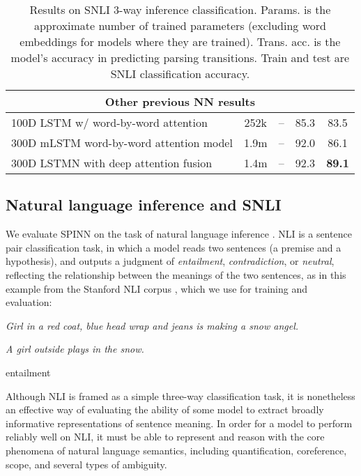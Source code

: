 \documentclass[11pt]{article}
\begin{document}
\begin{table*}[t]
\begin{tabular}{lcccc}
\midrule
\multicolumn{5}{c}{Other previous NN results}\\
\midrule
100D LSTM w/ word-by-word attention \citep{rocktaschel2015reasoning}
                        & 252k               & --              &   85.3   &   83.5       \\
300D mLSTM word-by-word attention model \citep{DBLP:journals/corr/WangJ15b}
                        & 1.9m               & --             &   92.0   &   86.1      \\
300D LSTMN with deep attention fusion \citep{cheng2016long}
                        & 1.4m               & --                &   92.3   &   \textbf{89.1}      \\
    \bottomrule
  \end{tabular}
\caption{\protect\label{tab:results}Results on SNLI 3-way inference classification. Params. is the approximate number of trained parameters (excluding word embeddings for models where they are trained). Trans. acc. is the model's accuracy in predicting parsing transitions. Train and test are SNLI classification accuracy.} 
\end{table*}


\subsection{Natural language inference and SNLI}

We evaluate SPINN on the task of natural language inference \citep[NLI, also known as recognizing textual entailment, or RTE][]{dagan2006pascal,MacCartney09}. NLI is a sentence pair classification task, in which a model reads two sentences (a premise and a hypothesis), and outputs a judgment of {\it entailment}, {\it contradiction}, or {\it neutral}, reflecting the relationship between the meanings of the two sentences, as in this example from the Stanford NLI corpus \citep[SNLI][]{snli:emnlp2015}, which we use for training and evaluation: 

\begin{description}\small 
\item[\bf Premise:] {\it Girl in a red coat, blue head wrap and jeans is making a snow angel.}
\item[\bf Hypothesis:] {\it A girl outside plays in the snow.}
\item[\bf Correct label:] entailment
\end{description}

Although NLI is framed as a simple three-way classification task, it is nonetheless an effective way of evaluating the ability of some model to extract broadly informative representations of sentence meaning. In order for a model to perform reliably well on NLI, it must be able to represent and reason with the core phenomena of natural language semantics, including quantification, coreference, scope, and several types of ambiguity.
\end{document}
